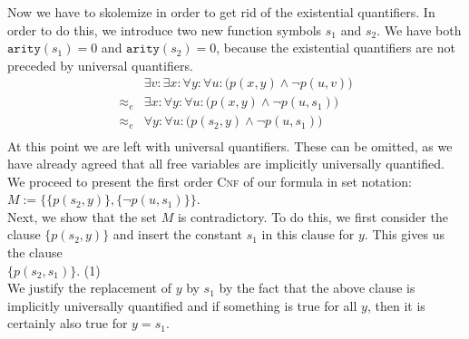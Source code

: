Now we have to skolemize in order to get rid of the existential quantifiers.
In order to do this, we introduce two new function symbols $s_1$ and $s_2$. 
We have both  $\mathtt{arity}(s_1) = 0$ and $\mathtt{arity}(s_2) = 0$, because the existential quantifiers are
not preceded by universal quantifiers.
$$
\begin{array}{ll}
           & \exists v\colon  \exists x\colon \forall y\colon \forall u\colon \Big( p(x,y) \wedge \neg p(u,v) \Big)\\
 \approx_e & \exists x\colon \forall y\colon \forall u\colon \Big( p(x,y) \wedge \neg p(u,s_1) \Big)\\
 \approx_e & \forall y\colon \forall u\colon \Big( p(s_2,y) \wedge \neg p(u,s_1) \Big)\\
\end{array}
$$
At this point we are left with  universal quantifiers.  These can be omitted,
as we have already agreed that all free variables are implicitly universally quantified.
We proceed to present the first order \textsc{Cnf} of our formula in set notation:
\\[0.2cm] 
\hspace*{1.3cm}
$M := \Big\{ \big\{ p(s_2,y) \big\}, \big\{\neg p(u,s_1)\big\}\Big\}$.
\\[0.2cm]
Next, we show that the set $M$ is contradictory.
To do this, we first consider the clause $\big\{ p(s_2,y) \big\}$ and insert 
the constant $s_1$ in this clause for $y$.  This gives us the clause \\[0.2cm]
\hspace*{1.3cm} $\big\{ p(s_2,s_1) \big\}$. \hspace*{\fill}(1)\\[0.2cm]
We justify the replacement of $y$ by $s_1$ by the fact that the above clause is implicitly
universally quantified and if something is true for all $y$, then it is certainly also true for $y = s_1$.

